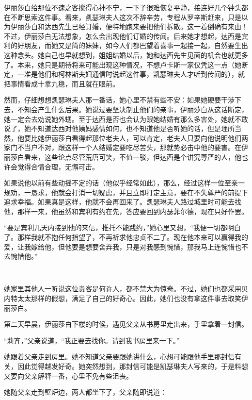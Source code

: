 \par 伊丽莎白给那位不速之客搅得心神不宁，一下子很难恢复平静，接连好几个钟头都在不断思索这件事。看来，凯瑟琳夫人这次不辞辛劳，专程从罗辛斯赶来，只是以为伊丽莎白和达西先生已经订婚，便特地跑来要把他们拆散。这一着倒确有来由！不过，伊丽莎白无法想象，怎么会出现他们订婚的传闻。后来她才想起，达西是宾利的好朋友，而她又是简的妹妹，如今人们都巴望着喜事一起接一起，自然要生出这种念头。她自己也早就想到，姐姐结婚以后，她和达西先生见面的机会也就更多了。本来，她只是期待将来可能出现这种情况，不想卢卡斯一家仅凭这一点（她断定，一准是他们和柯林斯夫妇通信时说起这件事，凯瑟琳夫人才听到传闻的），就把事情看成十拿九稳，而且就在眼前。
\par 然而，仔细想想凯瑟琳夫人那一番话，她心里不禁有些不安：如果她硬要干涉下去，不知会产生什么后果。她说过要坚决制止他们的亲事，伊丽莎白从这话断定，她一定会去劝说她外甥。至于达西是否也会认为跟她结婚有那么多害处，她就不敢说了，她不知道达西对他姨妈感情如何，也不知道他是否听她的话，但是理所当然，他要比她伊丽莎白看得起那位老夫人，可以肯定，老夫人只要向他说明他们两家门不当户不对，跟这样一个人结婚定要吃尽苦头，那就势必击中他的要害。在伊丽莎白看来，这些论点尽管荒唐可笑，不值一驳，但达西是个讲究尊严的人，他也许会觉得合情合理，无懈可击。
\par 如果说他以前有些动摇不定的话（他似乎经常如此），那么，经过这样一位至亲一规劝，一恳求，他就会打消一切疑虑，并且立即打定主意，要在不失尊严的前提下追求幸福。如果真是这样，他就不会再回来了。凯瑟琳夫人路过城里时可能去找他，那样一来，他虽然和宾利有约在先，答应要回到内瑟菲尔德，现在只好作罢。
\par “要是宾利几天内接到他的来信，推托不能践约，”她心里又想，“我便一切都明白了。那样我就不抱任何指望了，不再祈求他忠贞不二了。现在他本来可以赢得我的爱，让我嫁给他，但他要是想要舍弃我，只是对我感到惋惜，那我马上连惋惜也不去惋惜他。”
\par  
\par 她家里其他人一听说这位贵客是何许人，都不禁大为惊奇。不过，她们也都采用贝内特太太那样的假想，满足了自己的好奇心。因此，她们也没有拿这件事去取笑伊丽莎白。
\par 第二天早晨，伊丽莎白下楼的时候，遇见父亲从书房里走出来，手里拿着一封信。
\par “莉齐，”父亲说道，“我正要去找你。请到我书房里来一下。”
\par 她跟着父亲走到房里。她不知道父亲要跟她讲什么，心想可能跟他手里那封信有关，因此觉得越发好奇。她突然想到，那封信可能是凯瑟琳夫人写来的，于是料想又要向父亲解释一番，心里不免有些沮丧。
\par 她随父亲走到壁炉边，两人都坐下了，父亲随即说道：
